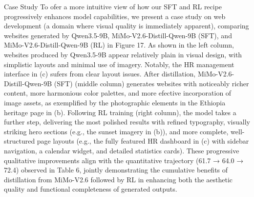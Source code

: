 \documentclass[
  10
]{article}
\begin{document}
Case Study To ofer a more intuitive view of how our SFT and RL recipe
progressively enhances model capabilities, we present a case study on
web development (a domain where visual quality is immediately apparent),
comparing websites generated by Qwen3.5-9B, MiMo-V2.6-Distill-Qwen-9B
(SFT), and MiMo-V2.6-Distill-Qwen-9B (RL) in Figure 17. As shown in the
left column, websites produced by Qwen3.5-9B appear relatively plain in
visual design, with simplistic layouts and minimal use of imagery.
Notably, the HR management interface in (c) sufers from clear layout
issues. After distillation, MiMo-V2.6-Distill-Qwen-9B (SFT) (middle
column) generates websites with noticeably richer content, more
harmonious color palettes, and more efective incorporation of image
assets, as exemplified by the photographic elements in the Ethiopia
heritage page in (b). Following RL training (right column), the model
takes a further step, delivering the most polished results with refined
typography, visually striking hero sections (e.g., the sunset imagery in
(b)), and more complete, well-structured page layouts (e.g., the fully
featured HR dashboard in (c) with sidebar navigation, a calendar widget,
and detailed statistics cards). These progressive qualitative
improvements align with the quantitative trajectory (61.7 → 64.0 → 72.4)
observed in Table 6, jointly demonstrating the cumulative benefits of
distillation from MiMo-V2.6 followed by RL in enhancing both the
aesthetic quality and functional completeness of generated outputs.
\end{document}
